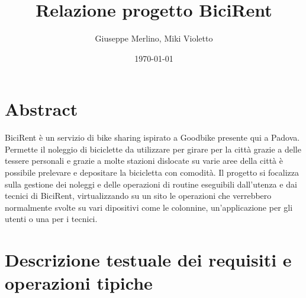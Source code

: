 \documentclass[a4paper,twoside]{article}
\author{Giuseppe Merlino, Miki Violetto}
\title{Relazione progetto BiciRent}
\date{\today}
\begin{document}
\maketitle

\newpage
\tableofcontents
\newpage
\listoffigures
\newpage

\section{Abstract}
BiciRent è un servizio di bike sharing ispirato a Goodbike presente qui a Padova.\newline
Permette il noleggio di biciclette da utilizzare per girare per la città grazie a delle tessere personali e grazie a molte stazioni dislocate su varie aree della città è possibile prelevare e depositare la bicicletta con comodità.\newline
Il progetto si focalizza sulla gestione dei noleggi e delle operazioni di routine eseguibili dall'utenza e dai tecnici di BiciRent, virtualizzando su un sito le operazioni che verrebbero normalmente svolte su vari dipositivi come le colonnine, un'applicazione per gli utenti o una per i tecnici.
\section{Descrizione testuale dei requisiti e operazioni tipiche}
\end{document}
